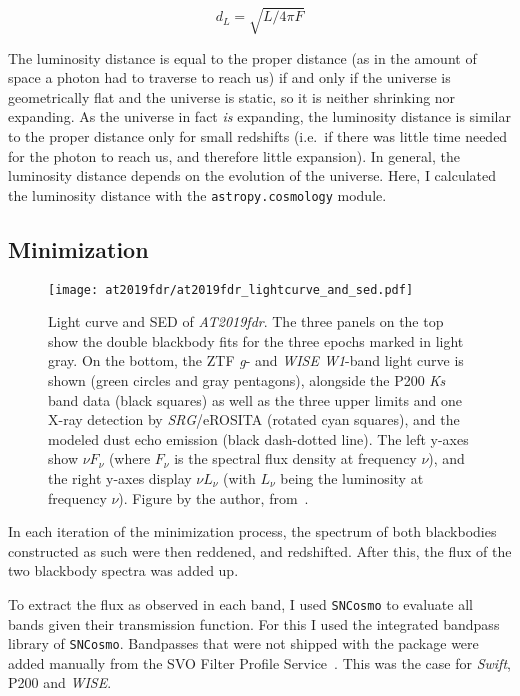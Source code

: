 \begin{equation}
    d_L = \sqrt{L/4\pi F}
\end{equation}

The luminosity distance is equal to the proper distance (as in the amount of space a photon had to traverse to reach us) if and only if the universe is geometrically flat and the universe is static, so it is neither shrinking nor expanding. As the universe in fact \textit{is} expanding, the luminosity distance is similar to the proper distance only for small redshifts (i.e.\ if there was little time needed for the photon to reach us, and therefore little expansion). In general, the luminosity distance depends on the evolution of the universe. Here, I calculated the luminosity distance with the \texttt{astropy.cosmology} module.

\subsection{Minimization}

\begin{figure*}[htb]
    \texttt{[image: at2019fdr/at2019fdr\_lightcurve\_and\_sed.pdf]}
    \caption[\emph{AT2019fdr} light and SED]{Light curve and SED of \emph{AT2019fdr}. The three panels on the top show the double blackbody fits for the three epochs marked in light gray. On the bottom, the ZTF \textit{g}- and \textit{WISE W1}-band light curve is shown (green circles and gray pentagons), alongside the P200 \textit{Ks} band data (black squares) as well as the three upper limits and one X-ray detection by \textit{SRG}/eROSITA (rotated cyan squares), and the modeled dust echo emission (black dash-dotted line). The left y-axes show $\nu F_\nu$ (where $F_\nu$ is the spectral flux density at frequency $\nu$), and the right y-axes display $\nu L_\nu$ (with $L_\nu$ being the luminosity at frequency $\nu$). Figure by the author, from~\cite{Reusch2022}.}
\end{figure*}

In each iteration of the minimization process, the spectrum of both blackbodies constructed as such were then reddened, and redshifted. After this, the flux of the two blackbody spectra was added up.

To extract the flux as observed in each band, I used \texttt{SNCosmo} to evaluate all bands given their transmission function. For this I used the integrated bandpass library of \texttt{SNCosmo}. Bandpasses that were not shipped with the package were added manually from the SVO Filter Profile Service~. This was the case for \textit{Swift}, P200 and \textit{WISE}.

